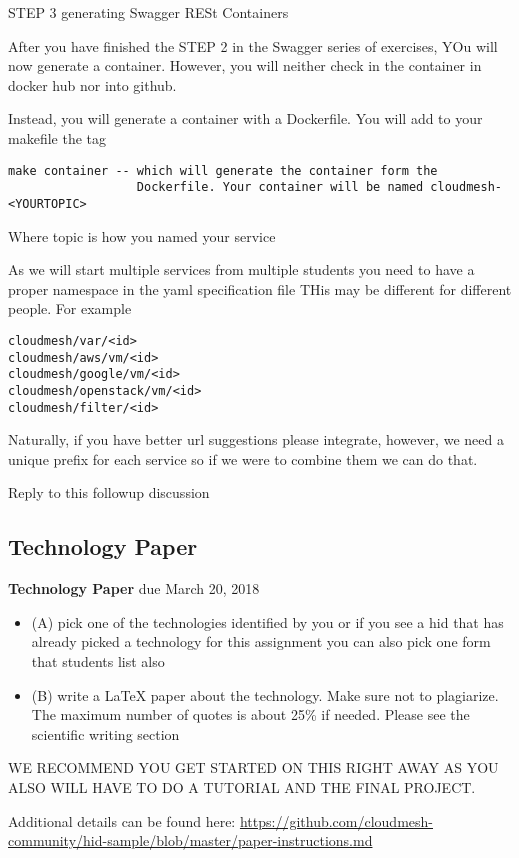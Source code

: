STEP 3 generating Swagger RESt Containers

 

After you have finished the STEP 2 in the Swagger series of exercises,
YOu will now generate a container. However, you will neither check in
the container in docker hub nor into github.

 

Instead, you will generate a container with a Dockerfile. You will add
to your makefile the tag

 
\begin{lstlisting}
make container -- which will generate the container form the
                  Dockerfile. Your container will be named cloudmesh-<YOURTOPIC>
\end{lstlisting}

Where topic is how you named your service

As we will start multiple services from multiple students you need to
have a proper namespace in the yaml specification file THis may be
different for different people. For example

 
\begin{lstlisting}
cloudmesh/var/<id>
cloudmesh/aws/vm/<id>
cloudmesh/google/vm/<id>
cloudmesh/openstack/vm/<id>
cloudmesh/filter/<id>
\end{lstlisting}

 

Naturally, if you have better url suggestions please integrate,
however, we need a unique prefix for each service so if we were to
combine them we can do that.

Reply to this followup discussion


\subsection{Technology Paper}
\label{E:616-tech-paper}

\begin{exercise} {\bf Technology Paper} due March 20, 2018

\begin{itemize}
Read the following two points to assist you in starting your paper 
\item (A) pick one of the technologies identified by you or if you see a
  hid that has already picked a technology for this assignment you can
  also pick one form that students list also

\item (B) write a LaTeX paper about the technology. Make sure not to
  plagiarize. The maximum number of quotes is about 25\% if
  needed. Please see the scientific writing section

\end{itemize}
 WE RECOMMEND YOU GET STARTED ON THIS RIGHT AWAY AS YOU ALSO WILL HAVE
 TO DO A TUTORIAL AND THE FINAL PROJECT.

Additional details can be found here:
\url{https://github.com/cloudmesh-community/hid-sample/blob/master/paper-instructions.md}

\end{exercise}

